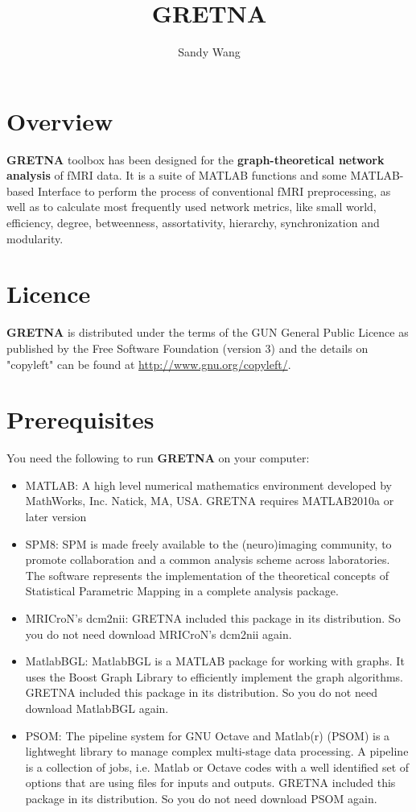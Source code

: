 \documentclass[11pt]{article}
\title{GRETNA}
\author{Sandy Wang}
\begin{document}
	\maketitle
	\tableofcontents
	\section{Overview}
		\textbf{GRETNA} toolbox has been designed for the \textbf{graph-theoretical network analysis} of fMRI data. 
		It is a suite of MATLAB functions and some MATLAB-based Interface to perform the process of conventional fMRI preprocessing,
		as well as to calculate most frequently used network metrics, 
		like small world, efficiency, degree, betweenness, assortativity, hierarchy, synchronization and modularity.
	\section{Licence}
		\textbf{GRETNA} is distributed under the terms of the GUN General Public Licence as published by the Free Software Foundation (version 3) 
		and the details on "copyleft" can be found at \url{http://www.gnu.org/copyleft/}.
	\section{Prerequisites}
		You need the following to run \textbf{GRETNA} on your computer:
		\begin{itemize}
			\item MATLAB: A high level numerical mathematics environment developed by MathWorks, Inc. Natick, MA, USA.
				GRETNA requires MATLAB2010a or later version
			\item SPM8: SPM is made freely available to the (neuro)imaging community, 
				to promote collaboration and a common analysis scheme across laboratories. 
				The software represents the implementation of the theoretical concepts of Statistical Parametric Mapping in a complete analysis package.
			\item MRICroN's dcm2nii: 
				GRETNA included this package in its distribution. So you do not need download MRICroN's dcm2nii again.
			\item MatlabBGL: MatlabBGL is a MATLAB package for working with graphs. 
				It uses the Boost Graph Library to efficiently implement the graph algorithms.
				GRETNA included this package in its distribution. So you do not need download MatlabBGL again.
			\item PSOM: The pipeline system for GNU Octave and Matlab(r) (PSOM) is a lightweght library to manage complex multi-stage data processing.
				A pipeline is a collection of jobs, i.e. Matlab or Octave codes with a well identified set of options that are using files for inputs and outputs.
				GRETNA included this package in its distribution. So you do not need download PSOM again.
		\end{itemize}
\end{document}
